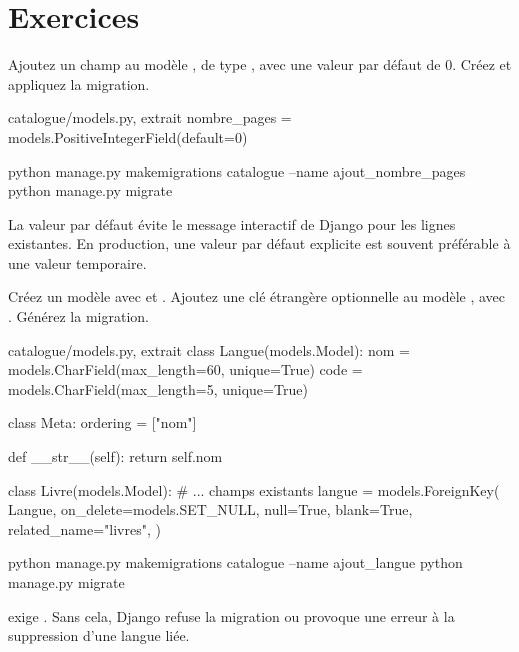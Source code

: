 \section{Exercices}

\begin{exercice}
Ajoutez un champ  au modèle , de type
, avec une valeur par défaut de 0. Créez et appliquez
la migration.
\end{exercice}

\begin{correction}
\begin{codebox}[python]{catalogue/models.py, extrait}
nombre_pages = models.PositiveIntegerField(default=0)
\end{codebox}

\begin{terminal}
python manage.py makemigrations catalogue --name ajout_nombre_pages
python manage.py migrate
\end{terminal}

La valeur par défaut évite le message interactif de Django pour les lignes
existantes. En production, une valeur par défaut explicite est souvent préférable
à une valeur temporaire.
\end{correction}

\begin{exercice}
Créez un modèle  avec  et . Ajoutez une clé
étrangère optionnelle  au modèle , avec
. Générez la migration.
\end{exercice}

\begin{correction}
\begin{codebox}[python]{catalogue/models.py, extrait}
class Langue(models.Model):
    nom = models.CharField(max_length=60, unique=True)
    code = models.CharField(max_length=5, unique=True)

    class Meta:
        ordering = ["nom"]

    def __str__(self):
        return self.nom


class Livre(models.Model):
    # ... champs existants
    langue = models.ForeignKey(
        Langue,
        on_delete=models.SET_NULL,
        null=True,
        blank=True,
        related_name="livres",
    )
\end{codebox}

\begin{terminal}
python manage.py makemigrations catalogue --name ajout_langue
python manage.py migrate
\end{terminal}

 exige . Sans cela, Django refuse la migration ou
provoque une erreur à la suppression d'une langue liée.
\end{correction}

